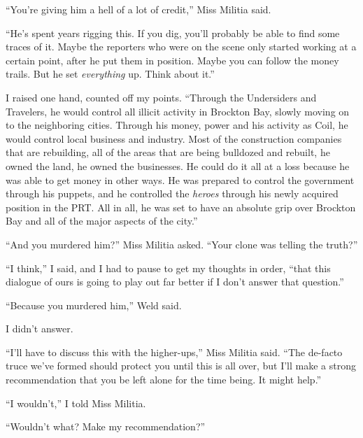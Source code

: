 ``You're giving him a hell of a lot of credit,'' Miss Militia said.



``He's spent years rigging this.  If you dig, you'll probably be able to find some traces of it.  Maybe the reporters who were on the scene only started working at a certain point, after he put them in position.  Maybe you can follow the money trails.  But he set \emph{everything} up.  Think about it.''



I raised one hand, counted off my points.  ``Through the Undersiders and Travelers, he would control all illicit activity in Brockton Bay, slowly moving on to the neighboring cities.  Through his money, power and his activity as Coil, he would control local business and industry.  Most of the construction companies that are rebuilding, all of the areas that are being bulldozed and rebuilt, he owned the land, he owned the businesses.  He could do it all at a loss because he was able to get money in other ways.  He was prepared to control the government through his puppets, and he controlled the \emph{heroes} through his newly acquired position in the PRT.  All in all, he was set to have an absolute grip over Brockton Bay and all of the major aspects of the city.''



``And you murdered him?'' Miss Militia asked.  ``Your clone was telling the truth?''



``I think,'' I said, and I had to pause to get my thoughts in order, ``that this dialogue of ours is going to play out far better if I don't answer that question.''



``Because you murdered him,'' Weld said.



I didn't answer.



``I'll have to discuss this with the higher-ups,'' Miss Militia said.  ``The de-facto truce we've formed should protect you until this is all over, but I'll make a strong recommendation that you be left alone for the time being.  It might help.''



``I wouldn't,'' I told Miss Militia.



``Wouldn't what?  Make my recommendation?''



